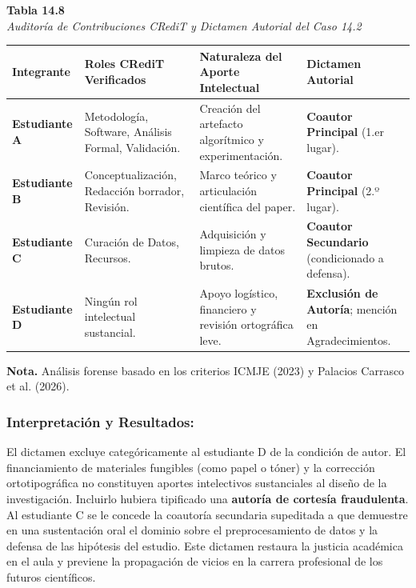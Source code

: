 \begin{table}[htbp]
\centering
\small
\renewcommand{\arraystretch}{1.2}
\textbf{Tabla 14.8}\\[0.15cm]
\textit{Auditoría de Contribuciones CRediT y Dictamen Autorial del Caso 14.2}\\[0.25cm]
\begin{tabularx}{\textwidth}{p{2.0cm}p{4.0cm}X p{3.2cm}}
\toprule
\textbf{Integrante} & \textbf{Roles CRediT Verificados} & \textbf{Naturaleza del Aporte Intelectual} & \textbf{Dictamen Autorial} \\
\midrule
\textbf{Estudiante A} & Metodología, Software, Análisis Formal, Validación. & Creación del artefacto algorítmico y experimentación. & \textbf{Coautor Principal} (1.er lugar). \\
\textbf{Estudiante B} & Conceptualización, Redacción borrador, Revisión. & Marco teórico y articulación científica del paper. & \textbf{Coautor Principal} (2.º lugar). \\
\textbf{Estudiante C} & Curación de Datos, Recursos. & Adquisición y limpieza de datos brutos. & \textbf{Coautor Secundario} (condicionado a defensa). \\
\textbf{Estudiante D} & Ningún rol intelectual sustancial. & Apoyo logístico, financiero y revisión ortográfica leve. & \textbf{Exclusión de Autoría}; mención en Agradecimientos. \\
\bottomrule
\end{tabularx}
\vspace{0.15cm}
\raggedright \scriptsize \textbf{Nota.} Análisis forense basado en los criterios ICMJE (2023) y Palacios Carrasco et al. (2026).
\end{table}

\subsubsection*{Interpretación y Resultados:}
El dictamen excluye categóricamente al estudiante D de la condición de autor. El financiamiento de materiales fungibles (como papel o tóner) y la corrección ortotipográfica no constituyen aportes intelectivos sustanciales al diseño de la investigación. Incluirlo hubiera tipificado una \textbf{autoría de cortesía fraudulenta}. Al estudiante C se le concede la coautoría secundaria supeditada a que demuestre en una sustentación oral el dominio sobre el preprocesamiento de datos y la defensa de las hipótesis del estudio. Este dictamen restaura la justicia académica en el aula y previene la propagación de vicios en la carrera profesional de los futuros científicos.

